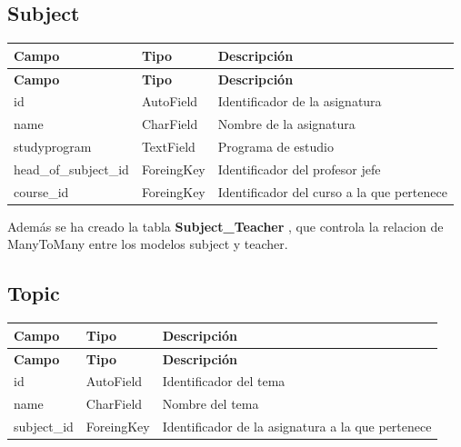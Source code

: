 \documentclass[a4paper,12pt]{article}
\begin{document}
\subsection{Subject}
\begin{longtable}{| p{3cm} | p{3cm}|p{10cm}|}
	\hline
	\textbf{Campo} & \textbf{Tipo} & \textbf{Descripción} \\
	\hline
	\endfirsthead
	\hline
	\textbf{Campo} & \textbf{Tipo} & \textbf{Descripción} \\
	\hline
	\endhead
	\hline
	\endfoot
	\hline
	\endlastfoot
	
	id & AutoField & Identificador de la asignatura \\
	\hline
	name & CharField & Nombre de la asignatura\\
	\hline
	studyprogram & TextField & Programa de estudio\\
	\hline
	head\_of\_subject\_id & ForeingKey & Identificador del profesor jefe\\
	\hline
	course\_id & ForeingKey & Identificador del curso a la que pertenece\\
	
	\hline
\end{longtable}
 Además se ha creado la tabla \textbf{Subject\_Teacher} , que controla la relacion de ManyToMany entre los modelos subject y teacher.


\subsection{Topic}
\begin{longtable}{| p{3cm} | p{3cm}|p{10cm}|}
	\hline
	\textbf{Campo} & \textbf{Tipo} & \textbf{Descripción} \\
	\hline
	\endfirsthead
	\hline
	\textbf{Campo} & \textbf{Tipo} & \textbf{Descripción} \\
	\hline
	\endhead
	\hline
	\endfoot
	\hline
	\endlastfoot
	
	id & AutoField & Identificador del tema \\
	\hline
	name & CharField & Nombre del tema\\
	\hline
	subject\_id & ForeingKey & Identificador de la asignatura a la que pertenece\\
	
	\hline
\end{longtable}
\end{document}
